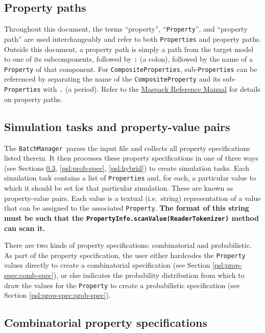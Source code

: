 \documentclass{article}
\newcommand{\BM}{{\tt BatchManager}}
\begin{document}
\subsection{Property paths}
\label{psl:prop-path}

Throughout this document, the terms ``property'', ``{\tt Property}'', and ``property path'' are used interchangeably and refer to both {\tt Properties} and property paths. Outside this document, a property path is simply a path from the target model to one of its subcomponents, followed by {\tt :} (a colon), followed by the name of a {\tt Property} of that component. For {\tt CompositeProperties}, sub-{\tt Properties} can be referenced by separating the name of the {\tt CompositeProperty} and its sub-{\tt Properties} with {\tt .} (a period). Refer to the \href{https://www.artisynth.org/Documentation/MaspackRefManual}{Maspack Reference Manual} for details on property paths.

\subsection{Simulation tasks and property-value pairs}
\label{psl:sim-task}

The \BM\ parses the input file and collects all property specifications listed therein. It then processes these property specifications in one of three ways (see Sections \ref{psl:comb-spec}, \ref{psl:prob-spec}, \ref{psl:hybrid}) to create simulation tasks. Each simulation task contains a list of {\tt Properties} and, for each, a particular value to which it should be set for that particular simulation. These are known as property-value pairs. Each value is a textual (i.e.\ string) representation of a value that can be assigned to the associated {\tt Property}. \textbf{The format of this string must be such that the {\tt PropertyInfo.scanValue(ReaderTokenizer)} method can scan it.}

There are two kinds of property specifications: combinatorial and probabilistic. As part of the property specification, the user either hardcodes the {\tt Property} values directly to create a combinatorial specification (see Section \ref{psl:prop-spec:comb-spec}), or else indicates the probability distribution from which to draw the values for the {\tt Property} to create a probabilistic specification (see Section \ref{psl:prop-spec:prob-spec}).

\subsection{Combinatorial property specifications}
\label{psl:comb-spec}
\end{document}
